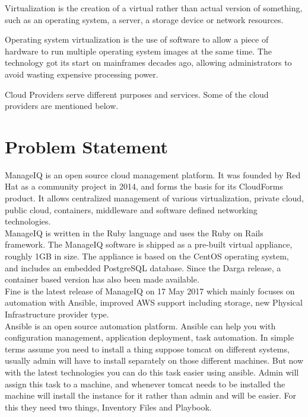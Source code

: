 \documentclass[a4paper,12pt]{report}
\begin{document}
Virtualization is the creation of a virtual rather than actual version of something, such as an operating system, a server, a storage device or network resources.

Operating system virtualization is the use of software to allow a piece of hardware to run multiple operating system images at the same time. The technology got its start on mainframes decades ago, allowing administrators to avoid wasting expensive processing power.

Cloud Providers serve different purposes and services. Some of the cloud providers are mentioned  below.

\chapter{Problem Statement}
ManageIQ is an open source cloud management platform. It was founded by Red Hat as a community project in 2014, and forms the basis for its CloudForms product. It allows centralized management of various virtualization, private cloud, public cloud, containers, middleware and software defined networking technologies.\\

ManageIQ is written in the Ruby language and uses the Ruby on Rails framework. The ManageIQ software is shipped as a pre-built virtual appliance, roughly 1GB in size. The appliance is based on the CentOS operating system, and includes an embedded PostgreSQL database. Since the Darga release, a container based version has also been made available.\\

Fine is the latest release of ManageIQ on 17 May 2017 which mainly focuses on automation with Ansible, improved AWS support including storage, new Physical Infrastructure provider type.\\

Ansible is an open source automation platform. Ansible can help you with configuration management, application deployment, task automation. In simple terms assume you need to install a thing suppose tomcat on different systems, usually admin will have to install separately on those different machines. But now with the latest technologies you can do this task easier using ansible. Admin will assign this task to a machine, and whenever tomcat needs to be installed the machine will install the instance for it rather than admin and will be easier. For this they need two things, Inventory Files and Playbook.\\
\end{document}
